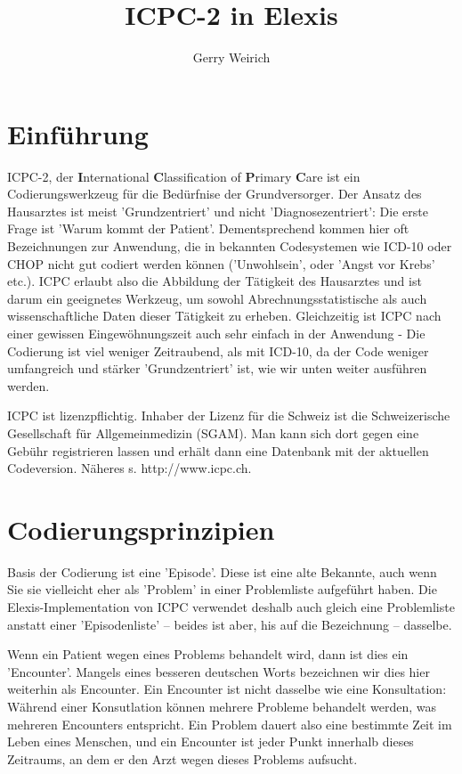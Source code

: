 \documentclass[a4paper]{scrartcl}
\begin{document}
\title{ICPC-2 in Elexis}
\author{Gerry Weirich}
\maketitle

\section{Einführung}
ICPC-2, der \textbf{I}nternational \textbf{C}lassification of \textbf{P}rimary \textbf{C}are ist ein Codierungswerkzeug für die Bedürfnise der Grundversorger. Der Ansatz des Hausarztes ist meist 'Grundzentriert' und nicht 'Diagnosezentriert': Die erste Frage ist 'Warum kommt der Patient'. Dementsprechend kommen hier oft Bezeichnungen zur Anwendung, die in bekannten Codesystemen wie ICD-10 oder CHOP nicht gut codiert werden können ('Unwohlsein', oder 'Angst vor Krebs' etc.). ICPC erlaubt also die Abbildung der Tätigkeit des Hausarztes und ist darum ein geeignetes Werkzeug, um sowohl Abrechnungsstatistische als auch wissenschaftliche Daten dieser Tätigkeit zu erheben. Gleichzeitig ist ICPC nach einer gewissen Eingewöhnungszeit auch sehr einfach in der Anwendung - Die Codierung ist viel weniger Zeitraubend, als mit ICD-10, da der Code weniger umfangreich und stärker 'Grundzentriert' ist, wie wir unten weiter ausführen werden.

\medskip
ICPC ist lizenzpflichtig. Inhaber der Lizenz für die Schweiz ist die Schweizerische Gesellschaft für Allgemeinmedizin (SGAM). Man kann sich dort gegen eine Gebühr registrieren lassen und erhält dann eine Datenbank mit der aktuellen Codeversion. Näheres s. http://www.icpc.ch.

\section{Codierungsprinzipien}
Basis der Codierung ist eine 'Episode'. Diese ist eine alte Bekannte, auch wenn Sie sie vielleicht eher als 'Problem' in einer Problemliste aufgeführt haben. Die Elexis-Implementation von ICPC verwendet deshalb auch gleich eine Problemliste anstatt einer 'Episodenliste' -- beides ist aber, his auf die Bezeichnung -- dasselbe.

\medskip

Wenn ein Patient wegen eines Problems behandelt wird, dann ist dies ein 'Encounter'. Mangels eines besseren deutschen Worts bezeichnen wir dies hier weiterhin als Encounter. Ein Encounter ist nicht dasselbe wie eine Konsultation: Während einer Konsutlation können mehrere Probleme behandelt werden, was mehreren Encounters entspricht. Ein Problem dauert also eine bestimmte Zeit im Leben eines Menschen, und ein Encounter ist jeder Punkt innerhalb dieses Zeitraums, an dem er den Arzt wegen dieses Problems aufsucht.
\end{document}
